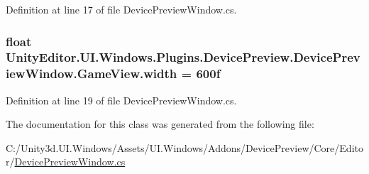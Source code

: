 Definition at line 17 of file Device\+Preview\+Window.\+cs.

\hypertarget{class_unity_editor_1_1_u_i_1_1_windows_1_1_plugins_1_1_device_preview_1_1_device_preview_window_1_1_game_view_ae6397fcd52ec37fcf89da109bb14796b}{}
\subsubsection[{width}]{\setlength{\rightskip}{0pt plus 5cm}float Unity\+Editor.\+U\+I.\+Windows.\+Plugins.\+Device\+Preview.\+Device\+Preview\+Window.\+Game\+View.\+width = 600f}\label{class_unity_editor_1_1_u_i_1_1_windows_1_1_plugins_1_1_device_preview_1_1_device_preview_window_1_1_game_view_ae6397fcd52ec37fcf89da109bb14796b}


Definition at line 19 of file Device\+Preview\+Window.\+cs.



The documentation for this class was generated from the following file\+:\begin{DoxyCompactItemize}
\item 
C\+:/\+Unity3d.\+U\+I.\+Windows/\+Assets/\+U\+I.\+Windows/\+Addons/\+Device\+Preview/\+Core/\+Editor/\hyperlink{_device_preview_window_8cs}{Device\+Preview\+Window.\+cs}\end{DoxyCompactItemize}
